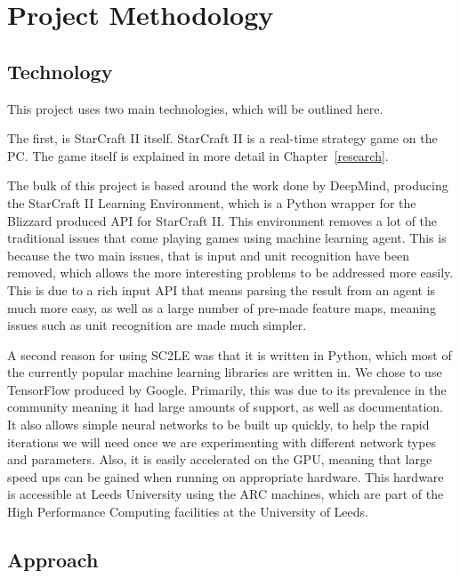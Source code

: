 \chapter{Project Methodology}%
\label{method}

\section{Technology}

This project uses two main technologies, which will be outlined here.

The first, is StarCraft II itself. StarCraft II is a real-time strategy game on
the PC\@. The game itself is explained in more detail in
Chapter~\ref{research}.

The bulk of this project is based around the work done by DeepMind, producing
the StarCraft II Learning Environment, which is a Python\cite{python-website}
wrapper for the Blizzard produced API for StarCraft II\cite{bliz-api}. This
environment removes a lot of the traditional issues that come playing
games using machine learning agent. This is because the two main issues, that
is input and unit recognition have been removed, which allows the more interesting
problems to be addressed more easily. This is due to a rich input API that means
parsing the result from an agent is much more easy, as well as a large number
of pre-made feature maps, meaning issues such as unit recognition are made much
simpler.

A second reason for using SC2LE was that it is written in Python, which most
of the currently popular machine learning libraries are written in. We chose to
use TensorFlow\cite{abadi2016tensorflow} produced by Google. Primarily,
this was due to its prevalence in the community meaning it had large amounts of
support, as well as documentation. It also allows simple neural networks to be
built up quickly, to help the rapid iterations we will need once we are experimenting
with different network types and parameters. Also, it is easily accelerated on the
GPU, meaning that large speed ups can be gained when running on appropriate hardware.
This hardware is accessible at Leeds University using the ARC machines, which are
part of the High Performance Computing facilities at the University
of Leeds\cite{arc}.

\section{Approach}

